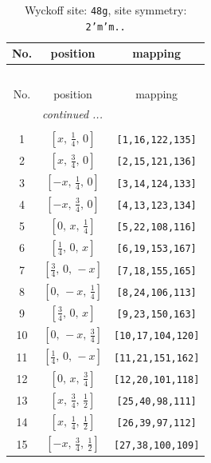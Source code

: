 \documentclass[fleqn,8pt]{jsarticle}
\begin{document}
\begin{longtable}{ccc}
\caption{Wyckoff site: {\tt 48g}, site symmetry: {\tt 2'm'm..}}
 \\
 \hline \hline
No. & position & mapping \\ \hline \endfirsthead

\multicolumn{2}{l}{\tablename\ \thetable{}} \\
 \hline \hline
No. & position & mapping \\ \hline \endhead

 \hline \hline
\multicolumn{2}{r}{\footnotesize\it continued ...} \\ \endfoot

 \hline \hline
\multicolumn{2}{r}{} \\ \endlastfoot

1 & $\left[ x,\, \frac{1}{4},\, 0 \right]$ & {\tt [1,16,122,135]} \\ \hline
2 & $\left[ x,\, \frac{3}{4},\, 0 \right]$ & {\tt [2,15,121,136]} \\ \hline
3 & $\left[ - x,\, \frac{1}{4},\, 0 \right]$ & {\tt [3,14,124,133]} \\ \hline
4 & $\left[ - x,\, \frac{3}{4},\, 0 \right]$ & {\tt [4,13,123,134]} \\ \hline
5 & $\left[ 0,\, x,\, \frac{1}{4} \right]$ & {\tt [5,22,108,116]} \\ \hline
6 & $\left[ \frac{1}{4},\, 0,\, x \right]$ & {\tt [6,19,153,167]} \\ \hline
7 & $\left[ \frac{3}{4},\, 0,\, - x \right]$ & {\tt [7,18,155,165]} \\ \hline
8 & $\left[ 0,\, - x,\, \frac{1}{4} \right]$ & {\tt [8,24,106,113]} \\ \hline
9 & $\left[ \frac{3}{4},\, 0,\, x \right]$ & {\tt [9,23,150,163]} \\ \hline
10 & $\left[ 0,\, - x,\, \frac{3}{4} \right]$ & {\tt [10,17,104,120]} \\ \hline
11 & $\left[ \frac{1}{4},\, 0,\, - x \right]$ & {\tt [11,21,151,162]} \\ \hline
12 & $\left[ 0,\, x,\, \frac{3}{4} \right]$ & {\tt [12,20,101,118]} \\ \hline
13 & $\left[ x,\, \frac{3}{4},\, \frac{1}{2} \right]$ & {\tt [25,40,98,111]} \\ \hline
14 & $\left[ x,\, \frac{1}{4},\, \frac{1}{2} \right]$ & {\tt [26,39,97,112]} \\ \hline
15 & $\left[ - x,\, \frac{3}{4},\, \frac{1}{2} \right]$ & {\tt [27,38,100,109]} \\ \hline

\end{longtable}
\end{document}
